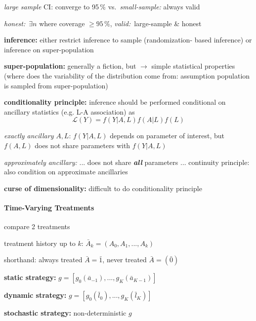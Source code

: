 \documentclass[8pt,twoside]{extarticle}
\begin{document}
\begin{multicols}{2}
\noindent \textit{large sample} CI: converge to 95\,\% vs.\ \textit{small-sample:} always valid



\noindent \textit{honest:}\ $\exists n$ where coverage $\geq 95\,\%$,
\textit{valid:}\ large-sample \& honest

\noindent \textbf{inference:} either
restrict inference to sample (randomization- based inference) or inference on super-population


\noindent \textbf{super-population:} generally a fiction, but $\to$ simple statistical properties (where does the variability of the distribution come from: 
assumption population is sampled from super-population)

\noindent \textbf{conditionality principle:} inference should be performed conditional on ancillary statistics (e.g. L-A association) as $$\mathcal{L}(Y)=f(Y|A, L)f(A|L)f(L)$$

\noindent\textit{exactly ancillary} $A,L$: $f(Y|A, L)$ depends on parameter of interest, but $f(A,L)$ does not share parameters with $f(Y|A, L)$


\noindent\textit{approximately ancillary:}  ... does not share \textit{\textbf{all}} parameters ... 
continuity principle: also condition on approximate ancillaries

\noindent \textbf{curse of dimensionality:} difficult to do conditionality principle


\vspace{1.5em}

\noindent \colorbox{lightgray!20!white}{\begin{minipage}{28em}



\paragraph{Time-Varying Treatments} compare 2 treatments

\noindent treatment history up to $k$: $\bar{A}_k=(A_0, A_1, ..., A_k)$

\noindent shorthand: always treated $\bar{A} = \bar{1}$, never treated $\bar{A} = \left(\bar{0}\right)$

 \textbf{static strategy:} $g=\left[g_0(\bar{a}_{-1}), ..., g_K(\bar{a}_{K-1})\right]$

 \textbf{dynamic strategy:} $g=\left[g_0(\bar{l}_0), ..., g_K(\bar{l}_K)\right]$

 \textbf{stochastic strategy:} non-deterministic $g$



\end{minipage}}
\end{multicols}
\end{document}
